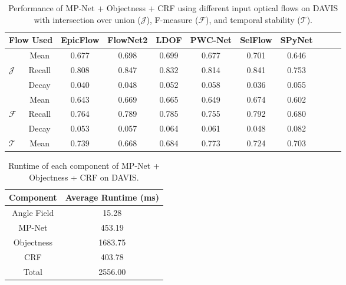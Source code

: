 \documentclass[10pt,letterpaper]{article}
\begin{document}
\begin{table*}
\footnotesize
\begin{center}
\begin{tabular}{l | c | c cccccccc}
\hline
\multicolumn{2}{c|}{Flow Used} & EpicFlow & FlowNet2 & LDOF & PWC-Net & SelFlow & SPyNet \\ \hline
                & Mean       & 0.677                   & 0.698                   & 0.699               & 0.677                  & 0.701                  & 0.646                 \\
\textit{$\mathcal{J}$}      & Recall     & 0.808                   & 0.847                   & 0.832               & 0.814                  & 0.841                  & 0.753                 \\
                & Decay      & 0.040                   & 0.048                   & 0.052               & 0.058                  & 0.036                  & 0.055                 \\ \hline
                & Mean       & 0.643                   & 0.669                   & 0.665               & 0.649                  & 0.674                  & 0.602                 \\
\textit{$\mathcal{F}$}      & Recall     & 0.764                   & 0.789                   & 0.785               & 0.755                  & 0.792                  & 0.680                 \\
                & Decay      & 0.053                   & 0.057                   & 0.064               & 0.061                  & 0.048                  & 0.082                 \\ \hline
\textit{$\mathcal{T}$}      & Mean       & 0.739                   & 0.668                   & 0.684               & 0.773                  & 0.724                  & 0.703                 \\ \hline
\end{tabular}
\caption{Performance of MP-Net + Objectness + CRF using different input optical flows on DAVIS with intersection over
union ($\mathcal{J}$), F-measure ($\mathcal{F}$), and temporal stability
($\mathcal{T}$).}
\vspace{-0.7cm}
\end{center}
\end{table*}

\begin{table*}
\footnotesize
\begin{center}
\begin{tabular}{c|c}
\hline
Component   & Average Runtime (ms) \\ \hline
Angle Field & 15.28                \\
MP-Net      & 453.19               \\
Objectness  & 1683.75              \\
CRF         & 403.78               \\
Total       & 2556.00
\end{tabular}
\caption{Runtime of each component of MP-Net + Objectness + CRF on DAVIS.}
\vspace{-0.7cm}
\end{center}
\end{table*}
\end{document}
